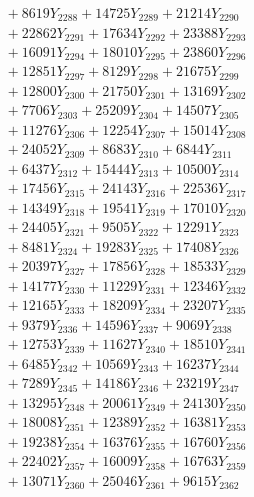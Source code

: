 \documentclass[a4paper,10pt]{article}
\begin{document}
{\begin{align}
&\;  + 8619 Y_{2288} + 14725 Y_{2289} + 21214 Y_{2290} \\[0.3ex]
&\;  + 22862 Y_{2291} + 17634 Y_{2292} + 23388 Y_{2293} \\[0.3ex]
&\;  + 16091 Y_{2294} + 18010 Y_{2295} + 23860 Y_{2296} \\[0.3ex]
&\;  + 12851 Y_{2297} + 8129 Y_{2298} + 21675 Y_{2299} \\[0.3ex]
&\;  + 12800 Y_{2300} + 21750 Y_{2301} + 13169 Y_{2302} \\[0.3ex]
&\;  + 7706 Y_{2303} + 25209 Y_{2304} + 14507 Y_{2305} \\[0.3ex]
&\;  + 11276 Y_{2306} + 12254 Y_{2307} + 15014 Y_{2308} \\[0.5ex]\allowbreak
&\;  + 24052 Y_{2309} + 8683 Y_{2310} + 6844 Y_{2311} \\[0.3ex]
&\;  + 6437 Y_{2312} + 15444 Y_{2313} + 10500 Y_{2314} \\[0.3ex]
&\;  + 17456 Y_{2315} + 24143 Y_{2316} + 22536 Y_{2317} \\[0.3ex]
&\;  + 14349 Y_{2318} + 19541 Y_{2319} + 17010 Y_{2320} \\[0.3ex]
&\;  + 24405 Y_{2321} + 9505 Y_{2322} + 12291 Y_{2323} \\[0.3ex]
&\;  + 8481 Y_{2324} + 19283 Y_{2325} + 17408 Y_{2326} \\[0.3ex]
&\;  + 20397 Y_{2327} + 17856 Y_{2328} + 18533 Y_{2329} \\[0.3ex]
&\;  + 14177 Y_{2330} + 11229 Y_{2331} + 12346 Y_{2332} \\[0.3ex]
&\;  + 12165 Y_{2333} + 18209 Y_{2334} + 23207 Y_{2335} \\[0.3ex]
&\;  + 9379 Y_{2336} + 14596 Y_{2337} + 9069 Y_{2338} \\[0.5ex]\allowbreak
&\;  + 12753 Y_{2339} + 11627 Y_{2340} + 18510 Y_{2341} \\[0.3ex]
&\;  + 6485 Y_{2342} + 10569 Y_{2343} + 16237 Y_{2344} \\[0.3ex]
&\;  + 7289 Y_{2345} + 14186 Y_{2346} + 23219 Y_{2347} \\[0.3ex]
&\;  + 13295 Y_{2348} + 20061 Y_{2349} + 24130 Y_{2350} \\[0.3ex]
&\;  + 18008 Y_{2351} + 12389 Y_{2352} + 16381 Y_{2353} \\[0.3ex]
&\;  + 19238 Y_{2354} + 16376 Y_{2355} + 16760 Y_{2356} \\[0.3ex]
&\;  + 22402 Y_{2357} + 16009 Y_{2358} + 16763 Y_{2359} \\[0.3ex]
&\;  + 13071 Y_{2360} + 25046 Y_{2361} + 9615 Y_{2362} \\[0.3ex]

\end{align}}
\end{document}
